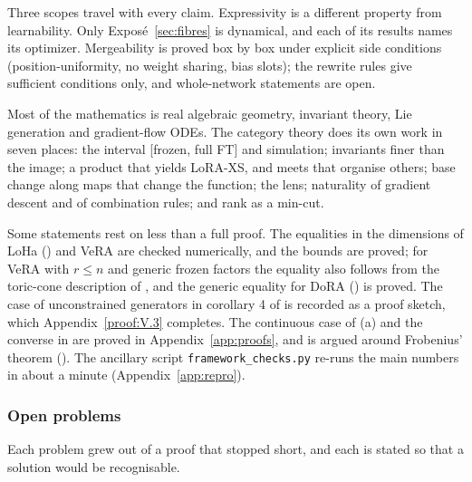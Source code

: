 Three scopes travel with every claim. Expressivity is a different property from learnability. Only
Exposé~\ref{sec:fibres} is dynamical, and each of its results names its optimizer. Mergeability is proved box by box
under explicit side conditions (position-uniformity, no weight sharing, bias slots); the rewrite rules give sufficient
conditions only, and whole-network statements are open.

Most of the mathematics is real algebraic geometry, invariant theory, Lie generation and gradient-flow ODEs. The category
theory does its own work in seven places: the interval [frozen, full FT] and simulation; invariants finer than the
image; a product that yields LoRA-XS, and meets that organise others; base change along maps that change the function;
the lens; naturality of gradient descent and of combination rules; and rank as a min-cut.

Some statements rest on less than a full proof. The equalities in the dimensions of LoHa ()
and VeRA are checked numerically, and the bounds are proved; for VeRA with $r\le n$ and generic frozen factors the
equality also follows from the toric-cone description of , and the generic equality for DoRA
() is proved. The case of unconstrained generators in corollary 4 of  is
recorded as a proof sketch, which Appendix~\ref{proof:V.3} completes. The continuous case of
(a) and the converse in  are proved in Appendix~\ref{app:proofs}, and
 is argued around Frobenius' theorem (). The ancillary script
\texttt{framework\_checks.py} re-runs the main numbers in about a minute (Appendix~\ref{app:repro}).

\subsubsection{Open problems}\label{sec:analogy-open}

Each problem grew out of a proof that stopped short, and each is stated so that a solution would be recognisable.

